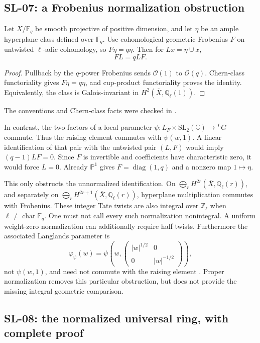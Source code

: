 \subsection{SL-07: a Frobenius normalization obstruction}
\label{sl:frobenius}

Let $X/\mathbb F_q$ be smooth projective of positive dimension, and let
$\eta$ be an ample hyperplane class defined over $\mathbb F_q$.  Use
cohomological geometric Frobenius $F$ on untwisted $\ell$-adic cohomology,
so $F\eta=q\eta$.  Then for $Lx=\eta\cup x$,
\[
 FL=qLF.
\]
\begin{proof}
Pullback by the $q$-power Frobenius sends $\mathcal O(1)$ to
$\mathcal O(q)$.  Chern-class functoriality gives $F\eta=q\eta$,
and cup-product functoriality proves the identity.  Equivalently, the class
is Galois-invariant in $H^2(\overline X,\mathbb Q_\ell(1))$.
\end{proof}
The conventions and Chern-class facts were checked in
\cite[Theorem 23.3 and \S27, especially Proposition 27.3]{MilneEtale}.

In contrast, the two factors of a local parameter
$\psi:L_F\times\mathrm{SL}_2(\mathbb C)\to{}^LG$ commute.  Thus the
raising element commutes with $\psi(w,1)$.  A linear identification of
that pair with the untwisted pair $(L,F)$ would imply
$(q-1)LF=0$.  Since $F$ is invertible and coefficients have characteristic
zero, it would force $L=0$.  Already $\mathbb P^1$ gives
$F=\operatorname{diag}(1,q)$ and a nonzero map $1\mapsto\eta$.

This only obstructs the unnormalized identification.  On
$\bigoplus_rH^{2r}(\overline X,\mathbb Q_\ell(r))$, and separately on
$\bigoplus_rH^{2r+1}(\overline X,\mathbb Q_\ell(r))$, hyperplane
multiplication commutes with Frobenius.  These integer Tate twists are
also integral over $\mathbb Z_\ell$ when $\ell\ne\operatorname{char}\mathbb F_q$.
One must not call every such normalization nonintegral.  A uniform
weight-zero normalization can additionally require half twists.
Furthermore the associated Langlands parameter is
\[
 \varphi_\psi(w)=\psi\left(w,
 \begin{pmatrix}|w|^{1/2}&0\\0&|w|^{-1/2}\end{pmatrix}\right),
\]
not $\psi(w,1)$, and need not commute with the raising element
\cite[\S2.2, equations (2.2.9)--(2.2.10)]{Mok}.  Proper normalization
removes this particular obstruction, but does not provide the missing
integral geometric comparison.

\subsection{SL-08: the normalized universal ring, with complete proof}
\label{sl:universal}

